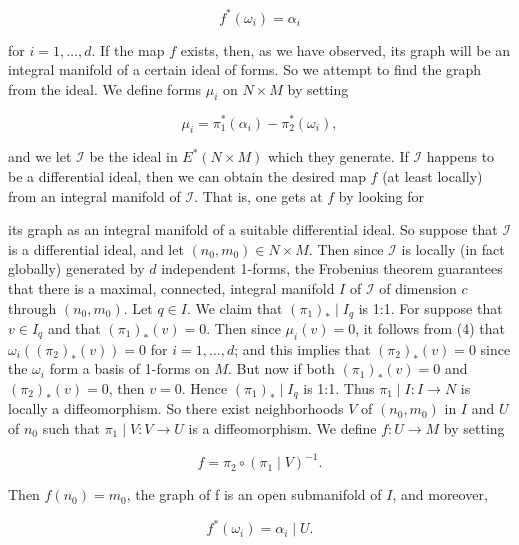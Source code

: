 \begin{equation}
\tag{3}\label{eq:2.33:3}
f^{*}(\omega_{i})=\alpha_{i}
\end{equation}

for $i=1,\ldots,d$. If the map $f$ exists, then, as we have observed, its graph will be an integral manifold of a certain ideal of forms. So we attempt to find the graph from the ideal. We define forms $\mu_{i}$ on $N\times M$ by setting

\begin{equation}
\tag{4}\label{eq:2.33:4}
\mu_{i}=\pi_{1}^{*}(\alpha_{i})-\pi_{2}^{*}(\omega_{i}),
\end{equation}

and we let $\mathcal{I}$ be the ideal in $E^{*}(N \times M)$ which they generate. If $\mathcal{I}$ happens to be a differential ideal, then we can obtain the desired map $f$ (at least locally) from an integral manifold of $\mathcal{I}$. That is, one gets at $f$ by looking for

its graph as an integral manifold of a suitable differential ideal. So suppose that $\mathcal{I}$ is a differential ideal, and let $(n_{0},m_{0})\in N\times M$. Then since $\mathcal{I}$ is locally (in fact globally) generated by $d$ independent 1-forms, the Frobenius theorem guarantees that there is a maximal, connected, integral manifold $I$ of $\mathcal{I}$ of dimension $c$ through $(n_{0},m_{0})$. Let $q\in I$. We claim that $(\pi_{1})_{*}\mid I_{q}$ is 1:1. For suppose that $v\in I_{q}$ and that $(\pi_{1})_{*}(v)=0$. Then since $\mu_{i}(v)=0$, it follows from (4) that $\omega_{i}((\pi_{2})_{*}(v))=0$ for $i=1,\ldots,d$; and this implies that $(\pi_{2})_{*}(v)=0$ since the $\omega_{i}$ form a basis of 1-forms on $M$. But now if both $(\pi_{1})_{*}(v)=0$ and $(\pi_{2})_{*}(v)=0$, then $v=0$. Hence $(\pi_{1})_{*}\mid I_{q}$ is 1:1. Thus $\pi_{1}\mid I:I\to N$ is locally a diffeomorphism. So there exist neighborhoods $V$ of $(n_{0},m_{0})$ in $I$ and $U$ of $n_{0}$ such that $\pi_{1}\mid V:V\to U$ is a diffeomorphism. We define $f:U\to M$ by setting

\begin{equation}
\tag{5}\label{eq:2.33:5}
f=\pi_{2}\circ(\pi_{1}\mid V)^{-1}.
\end{equation}

Then  $ f(n_{0}) = m_{0} $, the graph of f is an open submanifold of $I$, and moreover,

\begin{equation}
\tag{6}\label{eq:2.33:6}
f^{*}(\omega_{i})=\alpha_{i}\mid U.
\end{equation}

